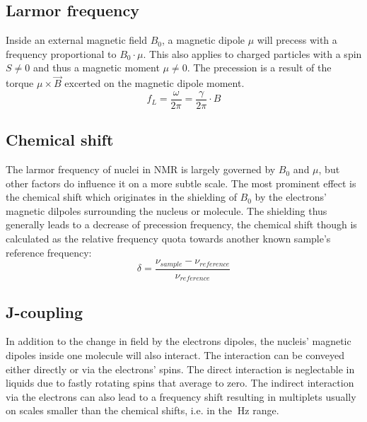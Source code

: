         \subsection{Larmor frequency}
        \label{section:theory:larmorFrequency}
            Inside an external magnetic field $B_0$, a magnetic dipole $\mu$ will precess with a frequency
            proportional to $B_0\cdot \mu$. This also applies to charged particles with a spin $S\neq0$ and thus
            a magnetic moment $\mu\neq0$. The precession is a result of the torque $\mu\times\vec B$
            excerted on the magnetic dipole moment.
            \begin{equation}
                f_L=\frac{\omega}{2\pi} = \frac{\gamma}{2\pi}\cdot B
            \end{equation}
        \subsection{Chemical shift}
            The larmor frequency of nuclei in NMR is largely governed by $B_0$ and $\mu$, but other factors do
            influence it on a more subtle scale. The most prominent effect is the chemical shift which
            originates in the shielding of $B_0$ by the electrons' magnetic dilpoles surrounding the nucleus or molecule.
            The shielding thus generally leads to a decrease of precession frequency, the chemical shift
            though is calculated as the relative frequency quota towards another known sample's
            reference frequency:
            \begin{equation}
                \delta = \frac{\nu_{sample} - \nu_{reference}}{\nu_{reference}}
            \end{equation}
        \subsection{J-coupling}
            In addition to the change in field by the electrons dipoles, the nucleis' magnetic
            dipoles inside one molecule will also interact. The interaction can be conveyed either
            directly or via the electrons' spins. The direct interaction is neglectable in liquids
            due to fastly rotating spins that average to zero. The indirect interaction via the
            electrons can also lead to a frequency shift resulting in multiplets usually on scales
            smaller than the chemical shifts, i.e. in the $\SI{}{\hertz}$ range.
